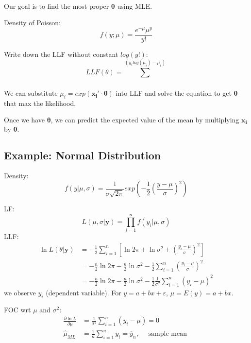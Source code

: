 \documentclass[12pt]{article}
\begin{document}
Our goal is to find the most proper $ \bm{\theta} $ using MLE.

Density of Poisson:
\begin{equation*}
		f(y;\mu) = \frac{e^{ - \mu} \mu^{y}}{y!}
\end{equation*}

Write down the LLF without constant $ log(y!) $:
\begin{equation*}
LLF(\theta) = \sum\limits_{} ^	(y_{i}log(\mu_{i}) - \mu_{i})
\end{equation*}

We can substitute $ \mu_{i} = exp(\bm{x_{i}}' \cdot \bm{\theta}) $ into LLF and solve
the equation to get $ \bm{\theta} $ that max the likelihood.

Once we have $ \bm{\theta} $, we can predict the expected value of the mean by
multiplying $ \bm{x_{i}} $ by $ \bm{\theta} $.







\subsection{Example: Normal Distribution}

Density:
\begin{equation*}
		f(y|\mu, \sigma) = \frac{1}{\sigma \sqrt{2 \pi}} exp \left(- \frac{1}{2} \left( 
				\frac{y - \mu}{\sigma}
				\right)^{2} \right)
\end{equation*}

LF:
\begin{equation*}
L(\mu,\sigma | \bm{y}) = \prod_{i = 1} ^ n f(y_{i}|\mu,\sigma)
\end{equation*}
LLF:
\begin{align*}
\ln L(\theta|\bm{y}) &=  - \frac{1}{2} \sum\limits_{i = 1} ^n
\left[ \ln 2 \pi  + \ln \sigma^{2} + 
\left( \frac{y_{i} - \mu}{\sigma} \right)^{2} \right] \\
&=  - \frac{n}{2}\ln 2 \pi -\frac{n}{2} \ln \sigma^{2}- \frac{1}{2}\sum\limits_{i = 1} ^n
 \left( \frac{y_{i} - \mu}{\sigma} \right) ^{2}\\
&=  - \frac{n}{2} \ln 2 \pi -\frac{n}{2}\ln \sigma^{2} - \frac{1}{2}\frac{1}{\sigma^{2}}
\sum\limits_{i = 1} ^n (y_{i} - \mu)^{2}	
\end{align*}
we observe $ y_{i} $ (dependent variable). 
For $ y = a + bx + \varepsilon $, $ \mu = E(y) = a + bx $.


FOC wrt $ \mu $ and $ \sigma^{2} $:
\begin{align*}
\frac{\partial \ln L }{\partial \mu }  &=   \frac{1}{\sigma^{2}}
\sum\limits_{i = 1} ^n (y_{i} - \mu)	= 0\\
\widehat{\mu}_{ML} &= \frac{1}{n}\sum\limits_{i = 1} ^n y_{i} =  \overline{y}_{n},	\quad
 \text{ sample mean }
\end{align*}
\end{document}
